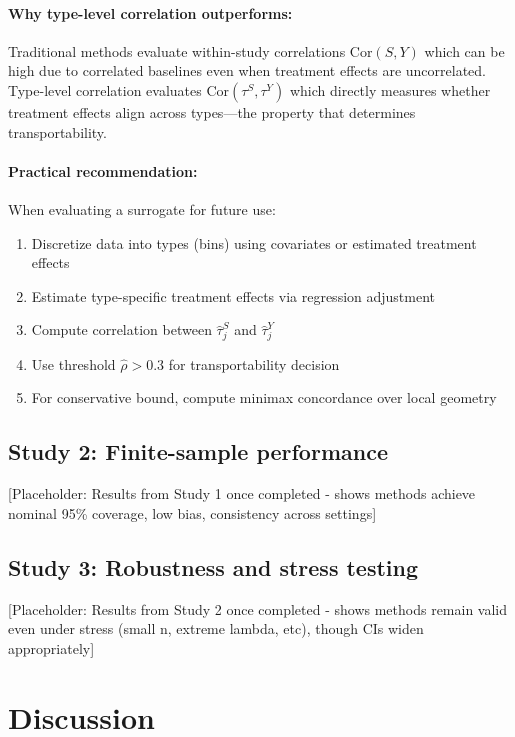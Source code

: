 \documentclass{article}
\begin{document}
\paragraph{Why type-level correlation outperforms:} Traditional methods evaluate within-study correlations $\text{Cor}(S, Y)$ which can be high due to correlated baselines even when treatment effects are uncorrelated. Type-level correlation evaluates $\text{Cor}(\tau^S, \tau^Y)$ which directly measures whether treatment effects align across types---the property that determines transportability.

\paragraph{Practical recommendation:} When evaluating a surrogate for future use:
\begin{enumerate}
    \item Discretize data into types (bins) using covariates or estimated treatment effects
    \item Estimate type-specific treatment effects via regression adjustment
    \item Compute correlation between $\hat{\tau}_j^S$ and $\hat{\tau}_j^Y$
    \item Use threshold $\hat{\rho} > 0.3$ for transportability decision
    \item For conservative bound, compute minimax concordance over local geometry
\end{enumerate}

\subsection{Study 2: Finite-sample performance}\label{sec:finite-sample}

[Placeholder: Results from Study 1 once completed - shows methods achieve nominal 95\% coverage, low bias, consistency across settings]

\subsection{Study 3: Robustness and stress testing}\label{sec:stress}

[Placeholder: Results from Study 2 once completed - shows methods remain valid even under stress (small n, extreme lambda, etc), though CIs widen appropriately]
\section{Discussion}\label{sec:discussion}
\end{document}
